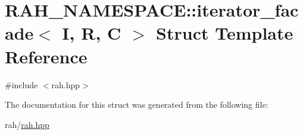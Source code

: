 \hypertarget{struct_r_a_h___n_a_m_e_s_p_a_c_e_1_1iterator__facade}{}\section{R\+A\+H\+\_\+\+N\+A\+M\+E\+S\+P\+A\+CE\+::iterator\+\_\+facade$<$ I, R, C $>$ Struct Template Reference}
\label{struct_r_a_h___n_a_m_e_s_p_a_c_e_1_1iterator__facade}


{\ttfamily \#include $<$rah.\+hpp$>$}



The documentation for this struct was generated from the following file\+:\begin{DoxyCompactItemize}
\item 
rah/\mbox{\hyperlink{rah_8hpp}{rah.\+hpp}}\end{DoxyCompactItemize}

